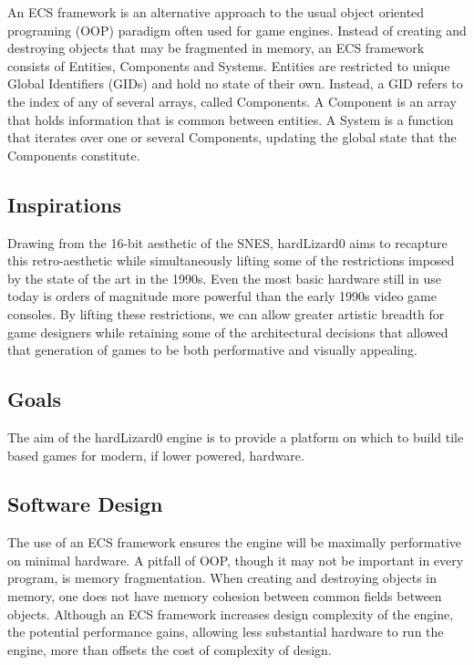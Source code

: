 \documentclass[journal]{IEEEtran}
\begin{document}
An ECS framework is an alternative approach to the usual object oriented programing (OOP) paradigm often used for game engines.
Instead of creating and destroying objects that may be fragmented in memory, an ECS framework consists of Entities, Components and Systems.
Entities are restricted to unique Global Identifiers (GIDs) and hold no state of their own. 
Instead, a GID refers to the index of any of several arrays, called Components.
A Component is an array that holds information that is common between entities.
A System is a function that iterates over one or several Components, updating the global state that the Components constitute.

\subsection{Inspirations}
Drawing from the 16-bit aesthetic of the SNES, hardLizard0 aims to recapture this retro-aesthetic while simultaneously lifting some of the restrictions imposed by the state of the art in the 1990s.
Even the most basic hardware still in use today is orders of magnitude more powerful than the early 1990s video game consoles.
By lifting these restrictions, we can allow greater artistic breadth for game designers while retaining some of the architectural decisions that allowed that generation of games to be both performative and visually appealing.

\subsection{Goals}
The aim of the hardLizard0 engine is to provide a platform on which to build tile based games for modern, if lower powered, hardware.

\subsection{Software Design}
The use of an ECS framework ensures the engine will be maximally performative on minimal hardware.
A pitfall of OOP, though it may not be important in every program, is memory fragmentation.
When creating and destroying objects in memory, one does not have memory cohesion between common fields between objects.
Although an ECS framework increases design complexity of the engine, the potential performance gains, allowing less substantial hardware to run the engine, more than offsets the cost of complexity of design.
\end{document}
